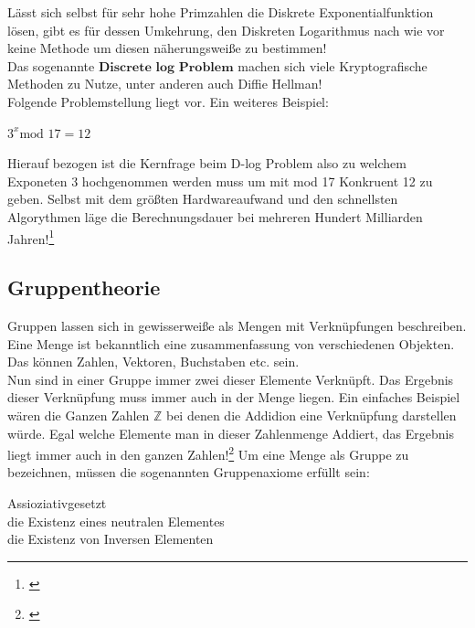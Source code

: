 \documentclass[a4paper,12pt]{scrartcl}
\begin{document}
Lässt sich selbst für sehr hohe Primzahlen die Diskrete Exponentialfunktion lösen, gibt es für dessen Umkehrung, den Diskreten Logarithmus nach wie vor keine Methode um diesen näherungsweiße zu bestimmen!\\
Das sogenannte $\textbf{Discrete log Problem}$ machen sich viele Kryptografische Methoden zu Nutze, unter anderen auch Diffie Hellman!\\
Folgende Problemstellung liegt vor. Ein weiteres Beispiel:
\begin{center}
 $3^x \text{mod 17} = 12$
 
\end{center}
Hierauf bezogen ist die Kernfrage beim D-log Problem also zu welchem Exponeten 3 hochgenommen werden muss um mit mod 17 Konkruent 12 zu geben. Selbst mit dem größten Hardwareaufwand und den schnellsten Algorythmen läge die Berechnungsdauer bei mehreren Hundert Milliarden Jahren!\footnote{\cite{Meinel2015}}
\begin{center}
 
\end{center}



\subsection{Gruppentheorie}

Gruppen lassen sich in gewisserweiße als Mengen mit Verknüpfungen beschreiben.\\
Eine Menge ist bekanntlich eine zusammenfassung von verschiedenen Objekten. Das können Zahlen, Vektoren, Buchstaben etc. sein.\\ Nun sind in einer Gruppe immer zwei dieser Elemente Verknüpft.
Das Ergebnis dieser Verknüpfung muss immer auch in der Menge liegen.
Ein einfaches Beispiel wären die Ganzen Zahlen $\mathbb{Z}$ bei denen die Addidion eine Verknüpfung darstellen würde. Egal welche Elemente man in dieser Zahlenmenge Addiert, das Ergebnis liegt immer auch in den ganzen Zahlen!\footnote{\cite{Meinel2015}}
Um eine Menge als Gruppe zu bezeichnen, müssen die sogenannten Gruppenaxiome erfüllt sein:
\begin{center}
  Assioziativgesetzt\\
  die Existenz eines neutralen Elementes\\
  die Existenz von Inversen Elementen
\end{center}
\end{document}
